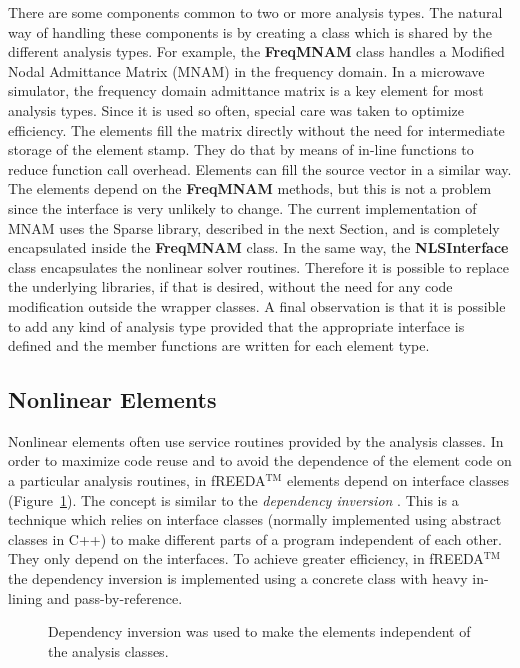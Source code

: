 There are some components common to two or more analysis types. The
natural way of handling these components is by creating a class which
is shared by the different analysis types. For example, the {\bf
FreqMNAM} class handles a Modified Nodal Admittance Matrix (MNAM) in
the frequency domain.  In a microwave simulator, the frequency domain
admittance matrix is a key element for most analysis types. Since it
is used so often, special care was taken to optimize efficiency.  The
elements fill the matrix directly without the need for intermediate
storage of the element stamp.  They do that by means of in-line
functions to reduce function call overhead. Elements can fill the
source vector in a similar way.  The elements depend on the {\bf
FreqMNAM} methods, but this is not a problem since the interface is
very unlikely to change.  The current implementation of MNAM uses the
Sparse library, described in the next Section, and is completely
encapsulated inside the {\bf FreqMNAM} class.  In the same way, the
{\bf NLSInterface} class encapsulates the nonlinear solver
routines. Therefore it is possible to replace the underlying
libraries, if that is desired, without the need for any code
modification outside the wrapper classes.  A final observation is that
it is possible to add any kind of analysis type provided that the
appropriate interface is defined and the member functions are written
for each element type.

\subsection{Nonlinear Elements} \label{sec:nlelem}

Nonlinear elements often use service routines provided by the analysis
classes. In order to maximize code reuse and to avoid the dependence
of the element code on a particular analysis routines, in fREEDA$^{\mathrm{TM}}$
elements depend on interface classes
(Figure~\ref{fig:depinversion}). The concept is similar to the
\emph{dependency inversion} \cite{dep_inv}. This is a technique which
relies on interface classes (normally implemented using abstract
classes in C++) to make different parts of a program independent of
each other. They only depend on the interfaces. To achieve greater
efficiency, in fREEDA$^{\mathrm{TM}}$ the dependency inversion is implemented using
a concrete class with heavy in-lining and pass-by-reference.

%
\begin{figure}[htpb]
\centerline{\epsfxsize=12cm }
\caption{Dependency inversion was used to make the elements
independent of the analysis classes.} \label{fig:depinversion}
\end{figure}
%

